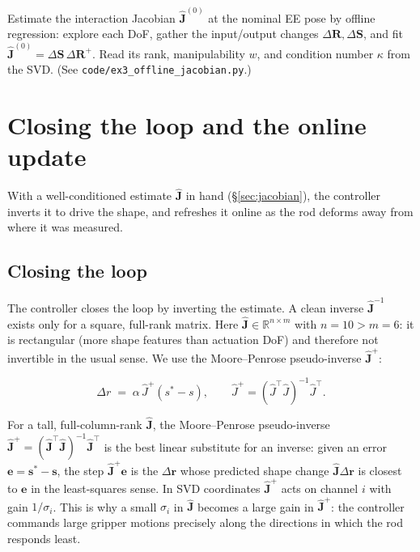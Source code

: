 \documentclass[11pt,a4paper]{article}
\begin{document}
\begin{labexercise}[Exercise~3]
Estimate the interaction Jacobian $\hat{\mathbf{J}}^{(0)}$ at the nominal EE pose by offline
regression: explore each DoF, gather the input/output changes $\Delta\mathbf{R},\Delta\mathbf{S}$, and fit
$\hat{\mathbf{J}}^{(0)}=\Delta\mathbf{S}\,\Delta\mathbf{R}^{+}$. Read its rank, manipulability $w$, and condition
number $\kappa$ from the SVD.
(See \texttt{code/ex3\_offline\_jacobian.py}.)
\end{labexercise}

\section{Closing the loop and the online update}
\label{sec:estimation}

With a well-conditioned estimate $\hat{\mathbf{J}}$ in hand (\S\ref{sec:jacobian}), the controller
inverts it to drive the shape, and refreshes it online as the rod deforms away from where
it was measured.

\subsection{Closing the loop}

The controller closes the loop by inverting the estimate. A clean inverse $\hat{\mathbf{J}}^{-1}$
exists only for a square, full-rank matrix. Here $\hat{\mathbf{J}}\in\mathbb{R}^{n\times m}$ with
$n=10>m=6$: it is rectangular (more shape features than actuation DoF) and therefore not
invertible in the usual sense. We use the Moore--Penrose pseudo-inverse $\hat{\mathbf{J}}^{+}$:
\begin{tcolorbox}[mathbox]
\begin{equation}
    \Delta r \;=\; \alpha\, \hat J^{+}(s^{*}-s),
    \qquad \hat J^{+} = (\hat J^{\top}\hat J)^{-1}\hat J^{\top}.
    \label{eq:ctrl}
\end{equation}
\end{tcolorbox}

\begin{intuition}
For a tall, full-column-rank $\hat{\mathbf{J}}$, the Moore--Penrose pseudo-inverse
$\hat{\mathbf{J}}^{+}=(\hat{\mathbf{J}}^{\top}\hat{\mathbf{J}})^{-1}\hat{\mathbf{J}}^{\top}$ is the best linear substitute for an inverse: given an
error $\mathbf{e}=\mathbf{s}^{*}-\mathbf{s}$, the step $\hat{\mathbf{J}}^{+}\mathbf{e}$ is the $\Delta\mathbf{r}$ whose predicted shape change
$\hat{\mathbf{J}}\Delta\mathbf{r}$ is closest to $\mathbf{e}$ in the least-squares sense. In SVD coordinates $\hat{\mathbf{J}}^{+}$ acts
on channel $i$ with gain $1/\sigma_i$. This is why a small $\sigma_i$ in $\hat{\mathbf{J}}$ becomes a
large gain in $\hat{\mathbf{J}}^{+}$: the controller commands large gripper motions precisely along the
directions in which the rod responds least.
\end{intuition}
\end{document}
